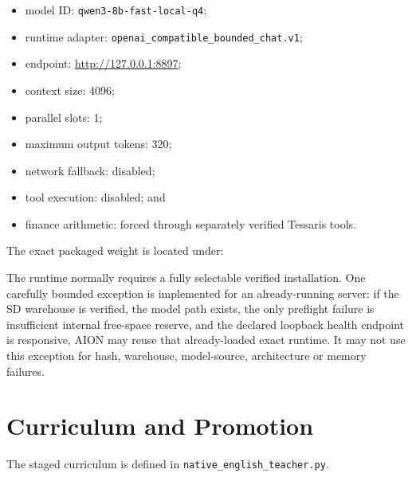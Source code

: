 \documentclass[11pt,a4paper]{article}
\begin{document}
\begin{itemize}
  \item model ID: \texttt{qwen3-8b-fast-local-q4};
  \item runtime adapter: \texttt{openai\_compatible\_bounded\_chat.v1};
  \item endpoint: \url{http://127.0.0.1:8897};
  \item context size: 4096;
  \item parallel slots: 1;
  \item maximum output tokens: 320;
  \item network fallback: disabled;
  \item tool execution: disabled; and
  \item finance arithmetic: forced through separately verified Tessaris tools.
\end{itemize}

The exact packaged weight is located under:

\begin{quote}
\end{quote}

The runtime normally requires a fully selectable verified installation. One carefully bounded
exception is implemented for an already-running server: if the SD warehouse is verified, the
model path exists, the only preflight failure is insufficient internal free-space reserve, and
the declared loopback health endpoint is responsive, AION may reuse that already-loaded exact
runtime. It may not use this exception for hash, warehouse, model-source, architecture or
memory failures.

\section{Curriculum and Promotion}

The staged curriculum is defined in \texttt{native\_english\_teacher.py}.
\end{document}
